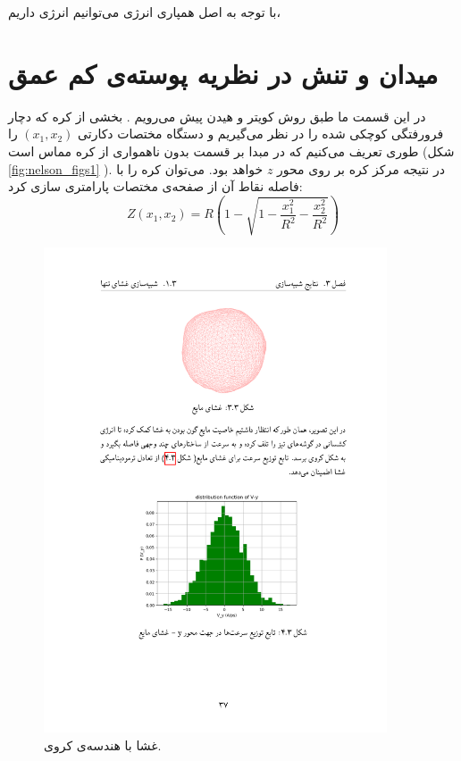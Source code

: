با توجه به اصل همپاری انرژی می‌توانیم انرژی داریم،


































\section{میدان و تنش در نظریه پوسته‌ی کم عمق}
در این قسمت ما طبق روش کویتر
و
هیدن
پیش می‌‌رویم
\cite{Heijden2008WTK}
. بخشی از کره که دچار فرورفتگی کوچکی شده را در نظر می‌گیریم و دستگاه مختصات دکارتی 
$(x_1,x_2)$
را طوری تعریف می‌کنیم که در مبدا بر قسمت بدون ناهمواری از کره مماس است (شکل 
\ref{fig:nelson_figs1}
). در نتیجه مرکز کره بر روی محور 
$z$
خواهد بود. می‌توان کره را با فاصله نقاط آن از صفحه‌ی مختصات پارامتری سازی کرد:
\begin{equation}
Z(x_1,x_2) = R\left(1-\sqrt{1-\frac{x_1^2}{R^2}-\frac{x_2^2}{R^2}}\right)
\label{eq:nelsonS1}
\end{equation}
\begin{figure}[h]
\begin{center}
\includegraphics[width=4in]{Figs/mem_sim1}
\caption{
غشا با هندسه‌ی کروی.
}
\label{fig:mem1}
\end{center}
\end{figure}
